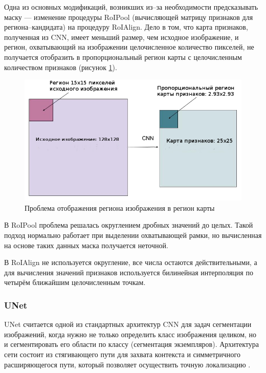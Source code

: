 Одна из основных модификаций, возникших из--за необходимости предсказывать маску --- изменение процедуры RoIPool (вычисляющей матрицу признаков для региона--кандидата) на процедуру RoIAlign. Дело в том, что карта признаков, полученная из CNN, имеет меньший размер, чем исходное изображение, и регион, охватывающий на изображении целочисленное количество пикселей, не получается отобразить в пропорциональный регион карты с целочисленным количеством признаков (рисунок \ref{fig:maskrcnn}). 

\begin{figure}[H]
	\centering
	\includegraphics[width=\textwidth]{img/maskrcnn.png}
	\caption{Проблема отображения региона изображения в регион карты}
	\label{fig:maskrcnn}
\end{figure}

В RoIPool проблема решалась округлением дробных значений до целых. Такой подход нормально работает при выделении охватывающей рамки, но вычисленная на основе таких данных маска получается неточной.

В RoIAlign не используется округление, все числа остаются действительными, а для вычисления значений признаков используется билинейная интерполяция по четырём ближайшим целочисленным точкам.

\subsubsection{UNet}

UNet считается одной из стандартных архитектур CNN для задач сегментации изображений, когда нужно не только определить класс изображения целиком, но и сегментировать его области по классу (сегментация экземпляров). Архитектура сети состоит из стягивающего пути для захвата контекста и симметричного расширяющегося пути, который позволяет осуществить точную локализацию \cite{unet}.


